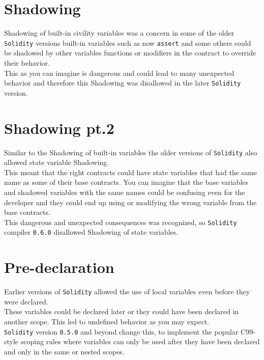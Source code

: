 \section{Shadowing}

Shadowing of built-in civility variables was a concern in some of the older \texttt{Solidity} versions built-in variables such as now \texttt{assert} and some others could be shadowed by other variables functions or modifiers in the contract to override their behavior.\\

This as you can imagine is dangerous and could lead to many unexpected behavior and therefore this Shadowing was disallowed in the later \texttt{Solidity} version.

\section{Shadowing pt.2}

Similar to the Shadowing of built-in variables the older versions of \texttt{Solidity} also allowed state variable Shadowing. \\

This meant that the right contracts could have state variables that had the same name as some of their base contracts. You can imagine that the base variables and shadowed variables with the same names could be confusing even for the developer and they could end up using or modifying the wrong variable from the base contracts.\\

This dangerous and unexpected consequences was recognized, so \texttt{Solidity} compiler \texttt{0.6.0} disallowed Shadowing of state variables.

\section{Pre-declaration}

Earlier versions of \texttt{Solidity} allowed the use of local variables even before they were declared. \\

These variables could be declared later or they could have been declared in another scope. This led to undefined behavior as you may expect. \\

\texttt{Solidity} version \texttt{0.5.0} and beyond change this, to implement the popular C99-style scoping rules where variables can only be used after they have been declared and only in the same or nested scopes.

